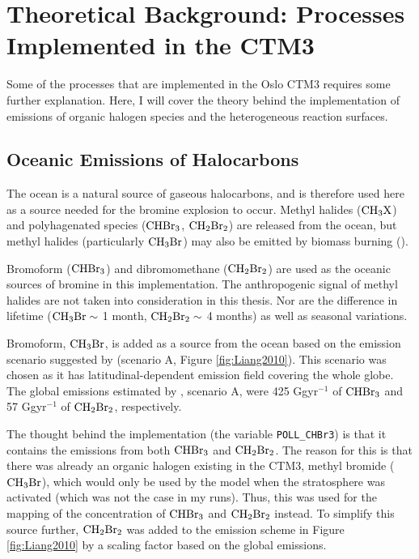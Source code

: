 \setcounter{chapter}{2} 
\chapter{Theoretical Background: Processes Implemented in the CTM3}\label{Chap:CTM3theory_ocean_hetReact}

Some of the processes that are implemented in the Oslo CTM3 requires some further explanation. Here, I will cover the theory behind the implementation of emissions of organic halogen species and the heterogeneous reaction surfaces.

\section{Oceanic Emissions of Halocarbons}\label{sec:oceanic_emissions}


The ocean is a natural source of gaseous halocarbons, and is therefore used here as a source needed for the bromine explosion to occur. Methyl halides ($\mathrm{CH_3X}$) and polyhagenated species ($\mathrm{CHBr_3}$, $\mathrm{CH_2Br_2}$) are released from the ocean, but methyl halides (particularly $\mathrm{CH_3Br}$) may also be emitted by biomass burning (\cite{SeinfeldSpyros}). 

\medskip

Bromoform ($\mathrm{CHBr_3}$) and dibromomethane ($\mathrm{CH_2Br_2}$) are used as the oceanic sources of bromine in this implementation. The anthropogenic signal of methyl halides are not taken into consideration in this thesis. Nor are the difference in lifetime ($\mathrm{CH_3Br} \sim$ 1 month, $\mathrm{CH_2Br_2} \sim$ 4 months) as well as seasonal variations. 


\medskip

Bromoform, $\mathrm{CH_3Br}$, is added as a source from the ocean based on the emission scenario suggested by \cite{Liang2010} (scenario A, Figure \ref{fig:Liang2010}). This scenario was chosen as it has latitudinal-dependent emission field covering the whole globe. The global emissions estimated by \cite{Liang2010}, scenario A, were 425 Ggyr$^{-1}$ of $\mathrm{CHBr_3}$ and 57 Ggyr$^{-1}$ of $\mathrm{CH_2Br_2}$, respectively.

\medskip

The thought behind the implementation (the variable \texttt{POLL\_CHBr3}) is that it contains the emissions from both $\mathrm{CHBr_3}$ and $\mathrm{CH_2Br_2}$. The reason for this is that there was already an organic halogen existing in the CTM3, methyl bromide ($\mathrm{CH_3Br}$), which would only be used by the model when the stratosphere was activated (which was not the case in my runs). Thus, this was used for the mapping of the concentration of $\mathrm{CHBr_3}$ and $\mathrm{CH_2Br_2}$ instead. To simplify this source further, $\mathrm{CH_2Br_2}$ was added to the emission scheme in Figure \ref{fig:Liang2010} by a scaling factor based on the global emissions. 

